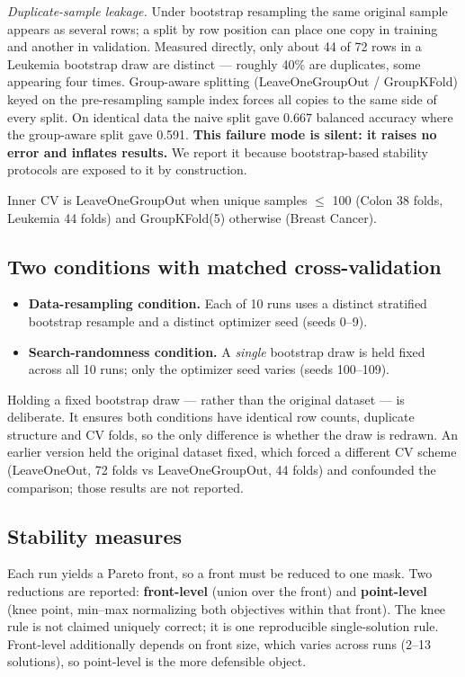 \documentclass[conference]{IEEEtran}
\providecommand{\tightlist}{\setlength{\itemsep}{0pt}\setlength{\parskip}{0pt}}
\begin{document}
\emph{Duplicate-sample leakage.} Under bootstrap resampling the same original sample appears as several rows; a split by row position can place one copy in training and another in validation. Measured directly, only about 44 of 72 rows in a Leukemia bootstrap draw are distinct --- roughly 40\% are duplicates, some appearing four times. Group-aware splitting (LeaveOneGroupOut / GroupKFold) keyed on the pre-resampling sample index forces all copies to the same side of every split. On identical data the naive split gave 0.667 balanced accuracy where the group-aware split gave 0.591. \textbf{This failure mode is silent: it raises no error and inflates results.} We report it because bootstrap-based stability protocols are exposed to it by construction.

Inner CV is LeaveOneGroupOut when unique samples $\leq$ 100 (Colon 38 folds, Leukemia 44 folds) and GroupKFold(5) otherwise (Breast Cancer).

\subsection{Two conditions with matched cross-validation}

\begin{itemize}
\tightlist
\item
  \textbf{Data-resampling condition.} Each of 10 runs uses a distinct stratified bootstrap resample and a distinct optimizer seed (seeds 0--9).
\item
  \textbf{Search-randomness condition.} A \emph{single} bootstrap draw is held fixed across all 10 runs; only the optimizer seed varies (seeds 100--109).
\end{itemize}

Holding a fixed bootstrap draw --- rather than the original dataset --- is deliberate. It ensures both conditions have identical row counts, duplicate structure and CV folds, so the only difference is whether the draw is redrawn. An earlier version held the original dataset fixed, which forced a different CV scheme (LeaveOneOut, 72 folds vs LeaveOneGroupOut, 44 folds) and confounded the comparison; those results are not reported.

\subsection{Stability measures}

Each run yields a Pareto front, so a front must be reduced to one mask. Two reductions are reported: \textbf{front-level} (union over the front) and \textbf{point-level} (knee point, min--max normalizing both objectives within that front). The knee rule is not claimed uniquely correct; it is one reproducible single-solution rule. Front-level additionally depends on front size, which varies across runs (2--13 solutions), so point-level is the more defensible object.
\end{document}
